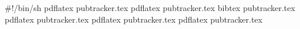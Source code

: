 #!/bin/sh
pdflatex pubtracker.tex
pdflatex pubtracker.tex
bibtex pubtracker.tex
pdflatex pubtracker.tex
pdflatex pubtracker.tex
pdflatex pubtracker.tex
